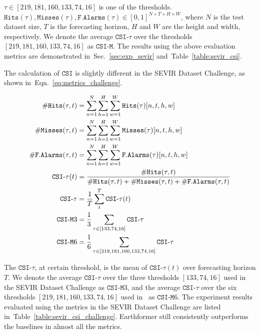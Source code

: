 \documentclass{article}
\newcommand{\tabref}[1]{Table~\ref{#1}}
\newcommand{\secref}[1]{Sec.~\ref{#1}}
\newcommand{\eqnref}[1]{Eqn.~\ref{#1}}
\begin{document}
$\tau\in[219, 181, 160, 133, 74, 16]$ is one of the thresholds. 
$\mathtt{Hits}(\tau),\mathtt{Misses}(\tau),\mathtt{F.Alarms}(\tau)\in[0,1]^{N\times T\times H\times W}$, where $N$ is the test dataset size, $T$ is the forecasting horizon, $H$ and $W$ are the height and width, respectively.
We denote the average $\mathtt{CSI}\mbox{-}\tau$ over the thresholds $[219, 181, 160, 133, 74, 16]$ as $\mathtt{CSI}\mbox{-}\mathtt{M}$.
The results using the above evaluation metrics are demonstrated in~\secref{sec:exp_sevir} and~\tabref{table:sevir_csi}.

The calculation of $\mathtt{CSI}$ is slightly different in the SEVIR Dataset Challenge, as shown in~\eqnref{eq:metrics_challenge}.

\begin{align}
    \centering
    \begin{aligned}
        \mathtt{\#Hits}(\tau, t) &= \sum^N_{n=1}\sum^H_{h=1}\sum^W_{w=1}\mathtt{Hits}(\tau)[n, t , h, w] \\
        \mathtt{\#Misses}(\tau, t) &= \sum^N_{n=1}\sum^H_{h=1}\sum^W_{w=1}\mathtt{Misses}(\tau)[n, t , h, w] \\
        \mathtt{\#F.Alarms}(\tau, t) &= \sum^N_{n=1}\sum^H_{h=1}\sum^W_{w=1}\mathtt{F.Alarms}(\tau)[n, t , h, w] \\
        \mathtt{CSI}\mbox{-}\tau(t) &= \frac{\mathtt{\#Hits}(\tau, t)}{\mathtt{\#Hits}(\tau, t)+\mathtt{\#Misses}(\tau, t)+\mathtt{\#F.Alarms}(\tau, t)} \\
        \mathtt{CSI}\mbox{-}\tau &= \frac{1}{T}\sum_t^T\mathtt{CSI}\mbox{-}\tau(t) \\
        \mathtt{CSI}\mbox{-}\mathtt{M}3 &= \frac{1}{3}\sum_{\tau\in[133, 74, 16]}\mathtt{CSI}\mbox{-}\tau \\
        \mathtt{CSI}\mbox{-}\mathtt{M}6 &= \frac{1}{6}\sum_{\tau\in[219, 181, 160, 133, 74, 16]}\mathtt{CSI}\mbox{-}\tau \\
    \end{aligned}
    \label{eq:metrics_challenge}
\end{align}

The $\mathtt{CSI}\mbox{-}\tau$, at certain threshold, is the mean of $\mathtt{CSI}\mbox{-}\tau(t)$ over forecasting horizon $T$.
We denote the average $\mathtt{CSI}\mbox{-}\tau$ over the three thresholds $[133, 74, 16]$ used in the SEVIR Dataset Challenge as $\mathtt{CSI}\mbox{-}\mathtt{M}3$, and the average $\mathtt{CSI}\mbox{-}\tau$ over the six thresholds $[219, 181, 160, 133, 74, 16]$ used in~\cite{veillette2020sevir} as $\mathtt{CSI}\mbox{-}\mathtt{M}6$.
The experiment results evaluated using the metrics in the SEVIR Dataset Challenge are listed in~\tabref{table:sevir_csi_challenge}.
Earthformer still consistently outperforms the baselines in almost all the metrics.
\end{document}
